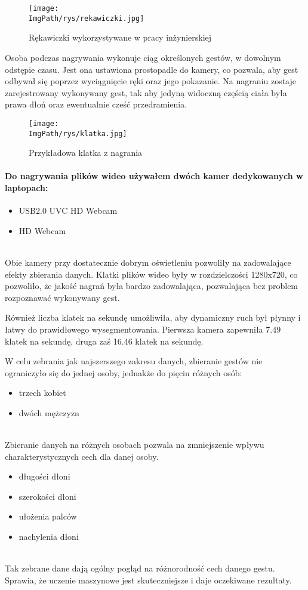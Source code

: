 \documentclass[a4paper,12pt,twoside,openany]{report}
\newcommand{\ImgPath}{.}
\begin{document}
\begin{figure}[H]	
	\centering
	\texttt{[image: \\ImgPath/rys/rekawiczki.jpg]}
	
	\caption{Rękawiczki wykorzystywane w pracy inżynierskiej}
\end{figure}

Osoba podczas nagrywania wykonuje ciąg określonych gestów, w dowolnym odstępie czasu. Jest ona ustawiona prostopadle do kamery, co pozwala, aby gest odbywał się poprzez wyciągnięcie ręki oraz jego pokazanie. Na nagraniu zostaje zarejestrowany wykonywany gest, tak aby jedyną widoczną częścią ciała była prawa dłoń oraz ewentualnie cześć przedramienia. 

\begin{figure}[H]	
	\centering
	\texttt{[image: \\ImgPath/rys/klatka.jpg]}
	
	\caption{Przykładowa klatka z nagrania}
\end{figure}

\paragraph{Do nagrywania plików wideo używałem dwóch kamer dedykowanych w laptopach:}
\begin{itemize}
	\item USB2.0 UVC HD Webcam
	\item HD Webcam
\end{itemize}
\mbox{} \\

Obie kamery przy dostatecznie dobrym oświetleniu pozwoliły na zadowalające efekty zbierania danych. Klatki plików wideo były w rozdzielczości 1280x720, co pozwoliło, że jakość nagrań była bardzo zadowalająca, pozwalająca bez problem rozpoznawać wykonywany gest. 

Również liczba klatek na sekundę umożliwiła, aby dynamiczny ruch był płynny i łatwy do prawidłowego wysegmentowania. Pierwsza kamera zapewniła 7.49 klatek na sekundę, druga zaś 16.46 klatek na sekundę.
 
W celu zebrania jak najszerszego zakresu danych, zbieranie gestów nie ograniczyło się do jednej osoby, jednakże do pięciu różnych osób:
\begin{itemize}
	\item trzech kobiet
	\item dwóch mężczyzn
\end{itemize}
\mbox{} \\
\indent 
 Zbieranie danych na różnych osobach pozwala na zmniejszenie wpływu charakterystycznych cech dla danej osoby. 
\begin{itemize}
	\item długości dłoni
	\item szerokości dłoni
	\item ułożenia palców
	\item nachylenia dłoni
\end{itemize}
\mbox{} \\
\indent
Tak zebrane dane dają ogólny pogląd na różnorodność cech danego gestu. Sprawia, że uczenie maszynowe jest skuteczniejsze i daje oczekiwane rezultaty. 
\end{document}

